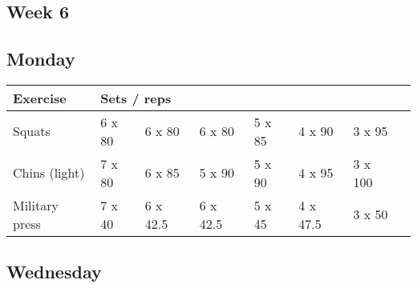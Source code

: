 \documentclass[12pt, a4paper]{article}%
\begin{document}
 \subsection*{\hspace{0.25em} Week 6 }
  \subsection*{\hspace{0.5em} Monday }


  \begin{tabular}{l|lllllll}
  \hspace{0.75em} \textbf{Exercise} & \multicolumn{ 7 }{l}{ \textbf{Sets / reps} } \\ \hline

            \hspace{0.75em} Squats
            & 6 x 80
            & 6 x 80
            & 6 x 80
            & 5 x 85
            & 4 x 90
            & 3 x 95
            & 
            \\


            \hspace{0.75em} Chins (light)
            & 7 x 80
            & 6 x 85
            & 5 x 90
            & 5 x 90
            & 4 x 95
            & 3 x 100
            & 
            \\


            \hspace{0.75em} Military press
            & 7 x 40
            & 6 x 42.5
            & 6 x 42.5
            & 5 x 45
            & 4 x 47.5
            & 3 x 50
            & 
            \\


  \end{tabular}

  \subsection*{\hspace{0.5em} Wednesday }
\end{document}
